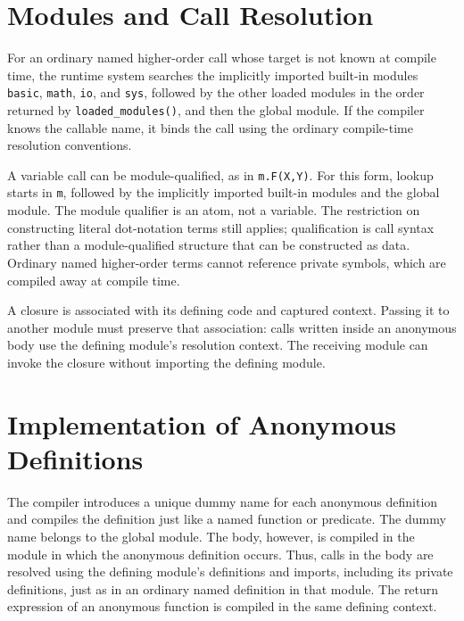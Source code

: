 \section{Modules and Call Resolution}
For an ordinary named higher-order call whose target is not known at compile
time, the runtime system searches the implicitly imported built-in modules
\texttt{basic}, \texttt{math}, \texttt{io}, and \texttt{sys}, followed by the
other loaded modules in the order returned by \texttt{loaded\_modules()}, and
then the global module. If the compiler knows the callable name, it binds the
call using the ordinary compile-time resolution conventions.

A variable call can be module-qualified, as in \texttt{m.F(X,Y)}. For this
form, lookup starts in \texttt{m}, followed by the implicitly imported
built-in modules and the global module. The module qualifier is an atom,
not a variable. The restriction on constructing literal dot-notation terms
still applies; qualification is call syntax rather than a module-qualified
structure that can be constructed as data. Ordinary named higher-order terms
cannot reference private symbols, which are compiled away at compile time.

A closure is associated with its defining code and captured context. Passing
it to another module must preserve that association: calls written inside an
anonymous body use the defining module's resolution context. The receiving
module can invoke the closure without importing the defining module.

\section{Implementation of Anonymous Definitions}
The compiler introduces a unique dummy name for each anonymous definition
and compiles the definition just like a named function or predicate. The
dummy name belongs to the global module. The body, however, is compiled in
the module in which the anonymous definition occurs. Thus, calls in the
body are resolved using the defining module's definitions and imports,
including its private definitions, just as in an ordinary named definition
in that module. The return expression of an anonymous function is compiled
in the same defining context.

